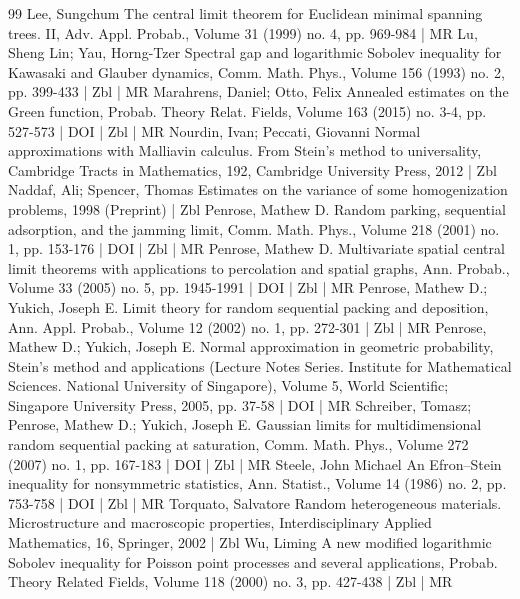 \begin{thebibliography}{99}
Lee, Sungchum The central limit theorem for Euclidean minimal spanning trees. II, Adv. Appl. Probab., Volume 31 (1999) no. 4, pp. 969-984 | MR
Lu, Sheng Lin; Yau, Horng-Tzer Spectral gap and logarithmic Sobolev inequality for Kawasaki and Glauber dynamics, Comm. Math. Phys., Volume 156 (1993) no. 2, pp. 399-433 | Zbl | MR
Marahrens, Daniel; Otto, Felix Annealed estimates on the Green function, Probab. Theory Relat. Fields, Volume 163 (2015) no. 3-4, pp. 527-573 | DOI | Zbl | MR
Nourdin, Ivan; Peccati, Giovanni Normal approximations with Malliavin calculus. From Stein’s method to universality, Cambridge Tracts in Mathematics, 192, Cambridge University Press, 2012 | Zbl
Naddaf, Ali; Spencer, Thomas Estimates on the variance of some homogenization problems, 1998 (Preprint) | Zbl
Penrose, Mathew D. Random parking, sequential adsorption, and the jamming limit, Comm. Math. Phys., Volume 218 (2001) no. 1, pp. 153-176 | DOI | Zbl | MR
Penrose, Mathew D. Multivariate spatial central limit theorems with applications to percolation and spatial graphs, Ann. Probab., Volume 33 (2005) no. 5, pp. 1945-1991 | DOI | Zbl | MR
Penrose, Mathew D.; Yukich, Joseph E. Limit theory for random sequential packing and deposition, Ann. Appl. Probab., Volume 12 (2002) no. 1, pp. 272-301 | Zbl | MR
Penrose, Mathew D.; Yukich, Joseph E. Normal approximation in geometric probability, Stein’s method and applications (Lecture Notes Series. Institute for Mathematical Sciences. National University of Singapore), Volume 5, World Scientific; Singapore University Press, 2005, pp. 37-58 | DOI | MR
Schreiber, Tomasz; Penrose, Mathew D.; Yukich, Joseph E. Gaussian limits for multidimensional random sequential packing at saturation, Comm. Math. Phys., Volume 272 (2007) no. 1, pp. 167-183 | DOI | Zbl | MR
Steele, John Michael An Efron–Stein inequality for nonsymmetric statistics, Ann. Statist., Volume 14 (1986) no. 2, pp. 753-758 | DOI | Zbl | MR
Torquato, Salvatore Random heterogeneous materials. Microstructure and macroscopic properties, Interdisciplinary Applied Mathematics, 16, Springer, 2002 | Zbl
Wu, Liming A new modified logarithmic Sobolev inequality for Poisson point processes and several applications, Probab. Theory Related Fields, Volume 118 (2000) no. 3, pp. 427-438 | Zbl | MR
\end{thebibliography}
